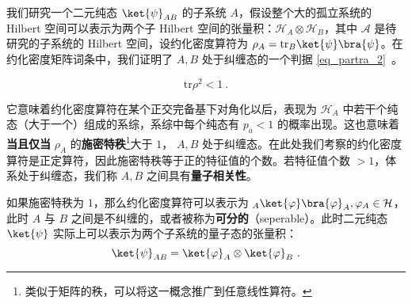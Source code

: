 

我们研究一个二元纯态 $\ket{\psi}_{AB}$ 的子系统 $A$，假设整个大的孤立系统的 Hilbert 空间可以表示为两个子 Hilbert 空间的张量积：$\mathcal{H}_A\otimes \mathcal{H}_B$，其中 $\mathcal A$ 是待研究的子系统的 Hilbert 空间，设约化密度算符为 $\rho_A=\text{tr}_B \ket{\psi}\bra{\psi}$。在约化密度矩阵词条中，我们证明了 $A,B$ 处于纠缠态的一个判据 \autoref{eq_partra_2}~。

\begin{equation}
\text{tr} \rho^2 <1~.
\end{equation}

它意味着约化密度算符在某个正交完备基下对角化以后，表现为 $\mathcal{H}_A$ 中若干个纯态（大于一个）组成的系综，系综中每个纯态有 $p_a<1$ 的概率出现。这也意味着\textbf{当且仅当} $\rho_A$ 的\textbf{施密特秩}\footnote{类似于矩阵的秩，可以将这一概念推广到任意线性算符。}大于 $1$， $A,B$ 处于纠缠态。在此处我们考察的约化密度算符是正定算符，因此施密特秩等于正的特征值的个数。若特征值个数 $>1$，体系处于纠缠态，我们称 $A,B$ 之间具有\textbf{量子相关性}。

如果施密特秩为 $1$，那么约化密度算符可以表示为 ${}_A\ket{\varphi}\bra{\varphi}_A,\varphi_A\in \mathcal{H}$，此时 $A$ 与 $B$ 之间是不纠缠的，或者被称为\textbf{可分的}（seperable）。此时二元纯态 $\ket{\psi}$ 实际上可以表示为两个子系统的量子态的张量积：
\begin{equation}
\ket{\psi}_{AB}=\ket{\varphi}_A\otimes \ket{\varphi}_B~.
\end{equation}
